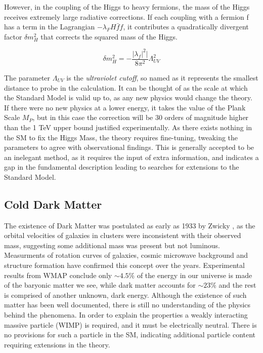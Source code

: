 However, in the coupling of the Higgs to heavy fermions, the mass of the Higgs receives extremely large radiative corrections. If each coupling with a fermion f has a term in the Lagrangian $-\lambda_{F} H \bar{f}f$, it contributes a quadratically divergent factor $\delta m^{2}_{H}$ that corrects the squared mass of the Higgs. 

\begin{equation}
\delta m^{2}_{H} = - \frac{|\lambda_{f}|^{2}|}{8 \pi^{2}}\Lambda^{2}_{UV}
\label{eqn:HIGGQUAD}
\end{equation}

The parameter $\Lambda_{UV}$ is the \textit{ultraviolet cutoff}, so named as it represents the smallest distance to probe in the calculation. It can be thought of as the scale at which the Standard Model is valid up to, as any new physics would change the theory. If there were no new physics at a lower energy, it takes the value of the Plank Scale $M_{P}$, but in this case the correction will be 30 orders of magnitude higher than the 1 TeV upper bound justified experimentally. As there exists nothing in the SM to fix the Higgs Mass, the theory requires fine-tuning, tweaking the parameters to agree with observational findings. This is generally accepted to be an inelegant method, as it requires the input of extra information, and indicates a gap in the fundamental description leading to searches for extensions to the Standard Model. 

\subsection{Cold Dark Matter}

The existence of Dark Matter was postulated as early as 1933 by Zwicky \cite{zwicky}, as the orbital velocities of galaxies in clusters were inconsistent with their observed mass, suggesting some additional mass was present but not luminous.  Measurments of rotation curves of galaxies, cosmic microwave background and structure formation have confirmed this concept over the years. Experimental results from WMAP conclude only $\sim 4.5\%$ of the energy in our universe is made of the baryonic matter we see, while dark matter accounts for $\sim 23\%$ and the rest is comprised of another unknown, dark energy. Although the existence of such matter has been well documented, there is still no understanding of the physics behind the phenomena. In order to explain the properties a weakly interacting massive particle (WIMP) is required, and it must be electrically neutral. There is no provisions for such a particle in the SM, indicating additional particle content requiring extensions in the theory. 

